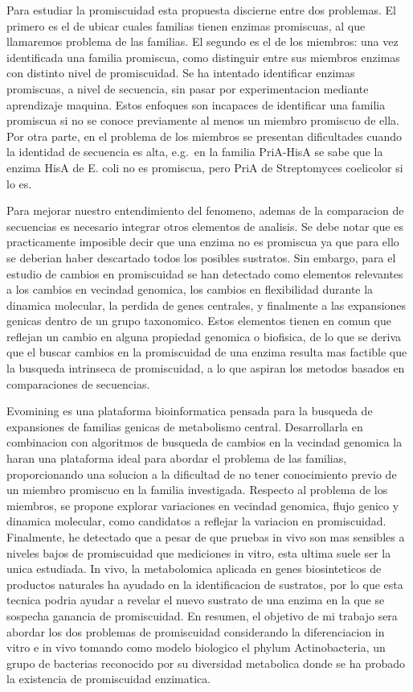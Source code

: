 \documentclass[12pt,twoside]{reedthesis}
\begin{document}
  Para estudiar la promiscuidad esta propuesta discierne entre dos
  problemas. El primero es el de ubicar cuales familias tienen enzimas
  promiscuas, al que llamaremos problema de las familias. El segundo es el
  de los miembros: una vez identificada una familia promiscua, como
  distinguir entre sus miembros enzimas con distinto nivel de
  promiscuidad. Se ha intentado identificar enzimas promiscuas, a nivel de
  secuencia, sin pasar por experimentacion mediante aprendizaje maquina.
  Estos enfoques son incapaces de identificar una familia promiscua si no
  se conoce previamente al menos un miembro promiscuo de ella. Por otra
  parte, en el problema de los miembros se presentan dificultades cuando
  la identidad de secuencia es alta, e.g.~en la familia PriA-HisA se sabe
  que la enzima HisA de E. coli no es promiscua, pero PriA de Streptomyces
  coelicolor si lo es.
  
  Para mejorar nuestro entendimiento del fenomeno, ademas de la
  comparacion de secuencias es necesario integrar otros elementos de
  analisis. Se debe notar que es practicamente imposible decir que una
  enzima no es promiscua ya que para ello se deberian haber descartado
  todos los posibles sustratos. Sin embargo, para el estudio de cambios en
  promiscuidad se han detectado como elementos relevantes a los cambios en
  vecindad genomica, los cambios en flexibilidad durante la dinamica
  molecular, la perdida de genes centrales, y finalmente a las expansiones
  genicas dentro de un grupo taxonomico. Estos elementos tienen en comun
  que reflejan un cambio en alguna propiedad genomica o biofisica, de lo
  que se deriva que el buscar cambios en la promiscuidad de una enzima
  resulta mas factible que la busqueda intrinseca de promiscuidad, a lo
  que aspiran los metodos basados en comparaciones de secuencias.
  
  Evomining es una plataforma bioinformatica pensada para la busqueda de
  expansiones de familias genicas de metabolismo central. Desarrollarla en
  combinacion con algoritmos de busqueda de cambios en la vecindad
  genomica la haran una plataforma ideal para abordar el problema de las
  familias, proporcionando una solucion a la dificultad de no tener
  conocimiento previo de un miembro promiscuo en la familia investigada.
  Respecto al problema de los miembros, se propone explorar variaciones en
  vecindad genomica, flujo genico y dinamica molecular, como candidatos a
  reflejar la variacion en promiscuidad. Finalmente, he detectado que a
  pesar de que pruebas in vivo son mas sensibles a niveles bajos de
  promiscuidad que mediciones in vitro, esta ultima suele ser la unica
  estudiada. In vivo, la metabolomica aplicada en genes biosinteticos de
  productos naturales ha ayudado en la identificacion de sustratos, por lo
  que esta tecnica podria ayudar a revelar el nuevo sustrato de una enzima
  en la que se sospecha ganancia de promiscuidad. En resumen, el objetivo
  de mi trabajo sera abordar los dos problemas de promiscuidad
  considerando la diferenciacion in vitro e in vivo tomando como modelo
  biologico el phylum Actinobacteria, un grupo de bacterias reconocido por
  su diversidad metabolica donde se ha probado la existencia de
  promiscuidad enzimatica.
  
\end{document}
